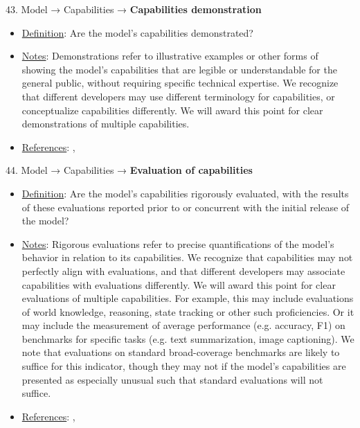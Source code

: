 43. Model → Capabilities → \textbf{Capabilities demonstration}
\vspace{-\parskip}
\begin{itemize}
\item
\underline{Definition}: Are the model’s capabilities demonstrated?
\item
\underline{Notes}: Demonstrations refer to illustrative examples or other forms of showing the model's capabilities that are legible or understandable for the general public, without requiring specific technical expertise. We recognize that different developers may use different terminology for capabilities, or conceptualize capabilities differently. We will award this point for clear demonstrations of multiple capabilities.
\item
\underline{References}: \citet{srivastava2022bigbench}, \citet{liang2022helm}
\end{itemize}


44. Model → Capabilities → \textbf{Evaluation of capabilities}
\vspace{-\parskip}
\begin{itemize}
\item
\underline{Definition}: Are the model’s capabilities rigorously evaluated, with the results of these evaluations reported prior to or concurrent with the initial release of the model?
\item
\underline{Notes}: Rigorous evaluations refer to precise quantifications of the model's behavior in relation to its capabilities. We recognize that capabilities may not perfectly align with evaluations, and that different developers may associate capabilities with evaluations differently. We will award this point for clear evaluations of multiple capabilities. For example, this may include evaluations of world knowledge, reasoning, state tracking or other such proficiencies. Or it may include the measurement of average performance (e.g. accuracy, F1) on benchmarks for specific tasks (e.g. text summarization, image captioning). We note that evaluations on standard broad-coverage benchmarks are likely to suffice for this indicator, though they may not if the model's capabilities are presented as especially unusual such that standard evaluations will not suffice.
\item
\underline{References}: \citet{srivastava2022bigbench}, \citet{liang2022helm}
\end{itemize}


